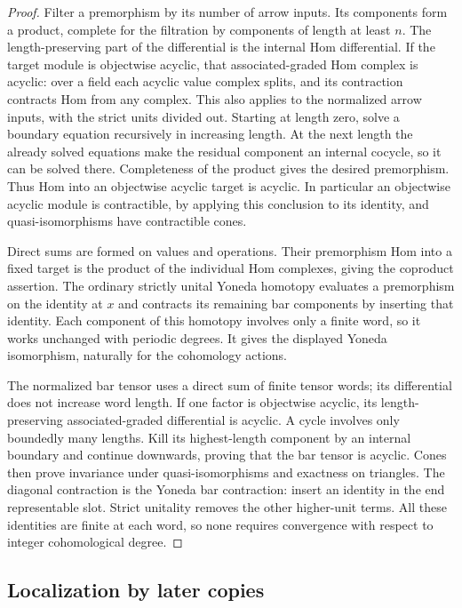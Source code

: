 \documentclass[11pt]{article}
\theoremstyle{definition}
\theoremstyle{remark}
\numberwithin{equation}{section}
\begin{document}
\begin{proof}
Filter a premorphism by its number of arrow inputs.  Its components
form a product, complete for the filtration by components of length
at least $n$.  The length-preserving part of the differential is the
internal Hom differential.  If the target module is objectwise
acyclic, that associated-graded Hom complex is acyclic: over a field
each acyclic value complex splits, and its contraction contracts Hom
from any complex.  This also applies to the normalized arrow inputs,
with the strict units divided out.  Starting at length zero, solve a
boundary equation recursively in increasing length.  At the next
length the already solved equations make the residual component an
internal cocycle, so it can be solved there.  Completeness of the
product gives the desired premorphism.  Thus Hom into an objectwise
acyclic target is acyclic.  In particular an objectwise acyclic
module is contractible, by applying this conclusion to its identity,
and quasi-isomorphisms have contractible cones.

Direct sums are formed on values and operations.  Their premorphism
Hom into a fixed target is the product of the individual Hom
complexes, giving the coproduct assertion.  The ordinary strictly
unital Yoneda homotopy evaluates a premorphism on the identity at
$x$ and contracts its remaining bar components by inserting that
identity.  Each component of this homotopy involves only a finite
word, so it works unchanged with periodic degrees.  It gives the
displayed Yoneda isomorphism, naturally for the cohomology actions.

The normalized bar tensor uses a direct sum of finite tensor words;
its differential does not increase word length.  If one factor is
objectwise acyclic, its length-preserving associated-graded
differential is acyclic.  A cycle involves only boundedly many
lengths.  Kill its highest-length component by an internal boundary
and continue downwards, proving that the bar tensor is acyclic.
Cones then prove invariance under quasi-isomorphisms and exactness
on triangles.  The diagonal contraction is the Yoneda bar
contraction: insert an identity in the end representable slot.
Strict unitality removes the other higher-unit terms.  All these
identities are finite at each word, so none requires convergence
with respect to integer cohomological degree.
\end{proof}

\subsection{Localization by later copies}
\end{document}
